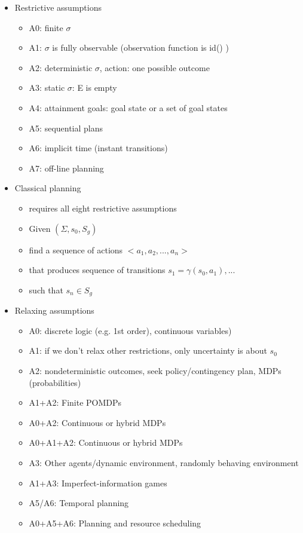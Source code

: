 \begin{itemize}
 \item Restrictive assumptions
 \begin{itemize}
  \item A0: finite $\sigma$
  \item A1: $\sigma$ is fully observable (observation function is id() )
  \item A2: deterministic $\sigma$, action: one possible outcome
  \item A3: static $\sigma$: E is empty
  \item A4: attainment goals: goal state or a set of goal states
  \item A5: sequential plans
  \item A6: implicit time (instant transitions)
  \item A7: off-line planning
 \end{itemize}
 
 \item Classical planning
 \begin{itemize}
  \item requires all eight restrictive assumptions
  \item Given $(\Sigma, s_0, S_g)$
  \item find a sequence of actions $<a_1,a_2,...,a_n>$
  \item that produces sequence of transitions $s_1 = \gamma(s_0,a_1), ...$
  \item such that $s_n \in S_g$
 \end{itemize}
 
 \item Relaxing assumptions
 \begin{itemize}
  \item A0: discrete logic (e.g. 1st order), continuous variables)
  \item A1: if we don't relax other restrictions, only uncertainty is about $s_0$
  \item A2: nondeterministic outcomes, seek policy/contingency plan, MDPs (probabilities)
  \item A1+A2: Finite POMDPs
  \item A0+A2: Continuous or hybrid MDPs
  \item A0+A1+A2: Continuous or hybrid MDPs
  \item A3: Other agents/dynamic environment, randomly behaving environment
  \item A1+A3: Imperfect-information games
  \item A5/A6: Temporal planning
  \item A0+A5+A6: Planning and resource scheduling
 \end{itemize}
 
\end{itemize}

